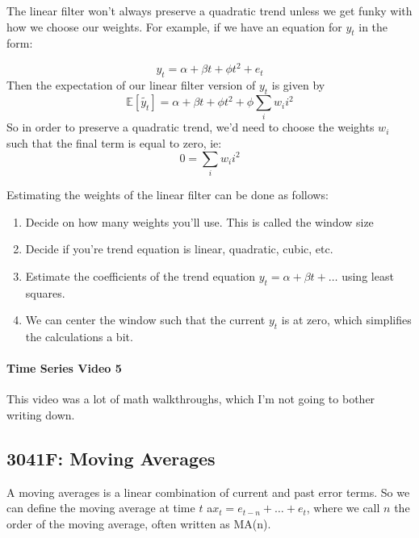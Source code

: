\documentclass[12pt]{article}
\begin{document}
        The linear filter won't always preserve a quadratic trend unless we get funky with
        how we choose our weights. For example, if we have an equation for $y_t$ in the
        form:

        \begin{equation*}
            y_t = \alpha + \beta t + \phi t^2 + e_t
        \end{equation*}
        Then the expectation of our linear filter version of $y_t$ is given by
        \begin{equation*}
            \mathbb{E}[\tilde{y_t}] = \alpha + \beta t + \phi t^2 + \phi \sum_i w_i i^2
        \end{equation*}
        So in order to preserve a quadratic trend, we'd need to choose the weights $w_i$ such
        that the final term is equal to zero, ie:
        \begin{equation*}
            0 = \sum_i w_i i^2
        \end{equation*}


        Estimating the weights of the linear filter can be done as follows:
        \begin{enumerate} 
            \item Decide on how many weights you'll use. This is called the window
                size
            \item Decide if you're trend equation is linear, quadratic, cubic, etc.
            \item Estimate the coefficients of the trend equation $y_t = \alpha + \beta t + \dots$ using least squares.
            \item We can center the window such that the current $y_t$ is at zero, which
                simplifies the calculations a bit.
        \end{enumerate} 

        \paragraph{Time Series Video 5} This video was a lot of math walkthroughs, which
        I'm not going to bother writing down.


    \subsection{3041F: Moving Averages}
        A moving averages is a linear combination of current and past error terms.
        So we can define the moving average at time $t$ a$x_t = e_{t-n} + \dots + e_t$, 
        where we call $n$ the order of the moving average, often written as MA(n).
\end{document}
